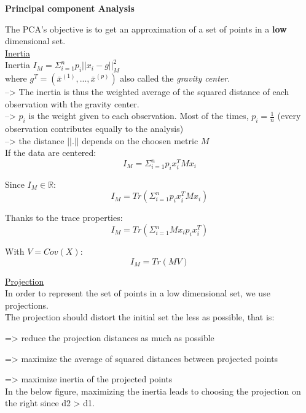 {\fontsize{12pt}{22pt} \textbf{Principal component Analysis}\par}

\vspace{5mm}

The PCA's objective is to get an approximation of a set of points in a \textbf{low} dimensional set. \\

\underline{Inertia} \\

Inertia $I_M = \Sigma_{i=1}^n p_i ||x_i - g||_M^2$ \\

where $g^T = (\bar{x}^{(1)},...,\bar{x}^{(p)})$ also called the \textit{gravity center}. \\

--> The inertia is thus the weighted average of the squared distance of each observation with the gravity center. \\

--> $p_i$ is the weight given to each observation. Most of the times, $p_i = \frac{1}{n}$ (every observation contributes equally to the analysis) \\

-->  the distance $||.||$ depends on the choosen metric $M$ \\

If the data are centered:
$$I_M = \Sigma_{i=1}^n p_i x_i^T M x_i$$

Since $I_M \in \mathbb{R}$:
$$I_M = Tr(\Sigma_{i=1}^n p_i x_i^T M x_i)$$

Thanks to the trace properties:
$$I_M = Tr(\Sigma_{i=1}^n M x_i p_i x_i^T)$$

With $V = Cov(X)$:
$$I_M = Tr(MV)$$

\underline{Projection} \\

In order to represent the set of points in a low dimensional set, we use projections. \\

The projection should distort the initial set the less as possible, that is:

=> reduce the projection distances as much as possible

=> maximize the average of squared distances between projected points

=> maximize inertia of the projected points \\

In the below figure, maximizing the inertia leads to choosing the projection on the right since d2 > d1.

